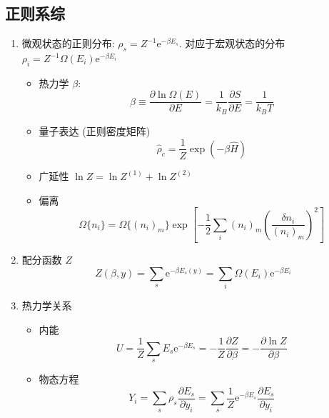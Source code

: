 \documentclass[12pt,a4paper]{article}%
\numberwithin{equation}{section}
\newcommand\e{\mathrm{e}}%
\begin{document}
\subsection{正则系综} %
\label{sub:Canonical}
\begin{enumerate}
    \item 微观状态的正则分布: $\rho_s = Z^{-1}\e^{-\beta E_s}$. 对应于宏观状态的分布 $\rho_i = Z^{-1}\Omega(E_i)\e^{-\beta E_i}$ 
    \begin{itemize}
        \item 热力学 $\beta$:
        \begin{equation}
            \beta\equiv \frac{\partial\ln\Omega(E)}{\partial E} 
            = \frac 1{k_B} \frac{\partial S}{\partial E} 
            = \frac 1{k_BT}
        \end{equation}
        \item 量子表达 (正则密度矩阵)
        \begin{equation}
            \hat \rho_c = \frac 1Z\exp(-\beta \hat H)
        \end{equation}
        \item 广延性 $\ln Z = \ln Z^{(1)} + \ln Z^{(2)}$
        \item 偏离
        \begin{equation}
            \Omega\{n_i\} = \Omega\{(n_i)_m\}\exp\left[-\frac 12\sum_i(n_i)_m
            \left(\frac{\delta n_i}{(n_i)_m}\right)^2\right]
        \end{equation}
    \end{itemize}
    \item 配分函数 $Z$
    \begin{equation}
        Z(\beta,y) = \sum_s\e^{-\beta E_s(y)} = \sum_i \Omega(E_i)\e^{-\beta E_i}
    \end{equation}
    \item 热力学关系
    \begin{itemize}
        \item 内能
        \begin{equation}
            U = \frac 1Z\sum_s E_s\e^{-\beta E_s} 
            = -\frac 1Z \frac{\partial Z}{\partial \beta} 
            = -\frac{\partial\ln Z}{\partial \beta}
        \end{equation}
        \item 物态方程
        \begin{equation}
            Y_i = \sum_s \rho_s \frac{\partial E_s}{\partial y_i}
             = \sum_s \frac1{Z}\e^{-\beta E_s}\frac{\partial E_s}{\partial y_i}

\end{equation}
\end{itemize}
\end{enumerate}
\end{document}
